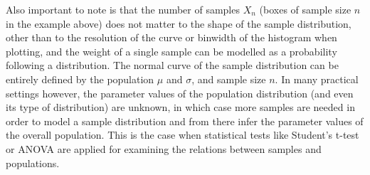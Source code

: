 \documentclass[
  12pt,
  a4paper, twoside]{book}
\begin{document}
Also important to note is that the number of samples \(X_n\) (boxes of sample size \(n\) in the example above) does not matter to the shape of the sample distribution, other than to the resolution of the curve or binwidth of the histogram when plotting, and the weight of a single sample can be modelled as a probability following a distribution. The normal curve of the sample distribution can be entirely defined by the population \(\mu\) and \(\sigma\), and sample size \(n\). In many practical settings however, the parameter values of the population distribution (and even its type of distribution) are unknown, in which case more samples are needed in order to model a sample distribution and from there infer the parameter values of the overall population. This is the case when statistical tests like Student's t-test or ANOVA are applied for examining the relations between samples and populations.
\end{document}
